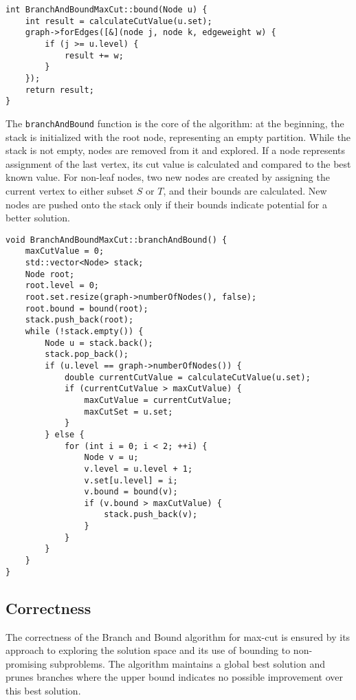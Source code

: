 \begin{verbatim}
int BranchAndBoundMaxCut::bound(Node u) {
    int result = calculateCutValue(u.set);
    graph->forEdges([&](node j, node k, edgeweight w) {
        if (j >= u.level) {
            result += w;
        }
    });
    return result;
}
\end{verbatim}

The \texttt{branchAndBound} function is the core of the algorithm:
at the beginning, the stack is initialized with the root node, representing an empty partition. While the stack is not empty, nodes are removed from it and explored. If a node represents assignment of the last vertex, its cut value is calculated and compared to the best known value. For non-leaf nodes, two new nodes are created by assigning the current vertex to either subset \(S\) or \(T\), and their bounds are calculated. New nodes are pushed onto the stack only if their bounds indicate potential for a better solution.

\begin{verbatim}
void BranchAndBoundMaxCut::branchAndBound() {
    maxCutValue = 0;
    std::vector<Node> stack;
    Node root;
    root.level = 0;
    root.set.resize(graph->numberOfNodes(), false);
    root.bound = bound(root);
    stack.push_back(root);
    while (!stack.empty()) {
        Node u = stack.back();
        stack.pop_back();
        if (u.level == graph->numberOfNodes()) {
            double currentCutValue = calculateCutValue(u.set);
            if (currentCutValue > maxCutValue) {
                maxCutValue = currentCutValue;
                maxCutSet = u.set;
            }
        } else {
            for (int i = 0; i < 2; ++i) {
                Node v = u;
                v.level = u.level + 1;
                v.set[u.level] = i;
                v.bound = bound(v);
                if (v.bound > maxCutValue) {
                    stack.push_back(v);
                }
            }
        }
    }
}
\end{verbatim}


\subsection{Correctness}
The correctness of the Branch and Bound algorithm for max-cut is ensured by its approach to exploring the solution space and its use of bounding to non-promising subproblems. The algorithm maintains a global best solution and prunes branches where the upper bound indicates no possible improvement over this best solution.

